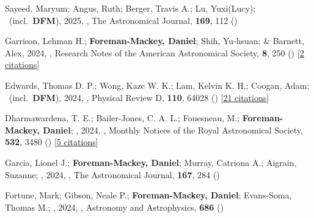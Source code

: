\item[{\color{numcolor}\scriptsize107}] Sayeed, Maryum; Angus, Ruth; Berger, Travis A.; Lu, Yuxi(Lucy); \etal\ (incl.\ \textbf{DFM}), 2025, , The Astronomical Journal, \textbf{169}, 112 ()

\item[{\color{numcolor}\scriptsize106}] Garrison, Lehman H.; \textbf{Foreman-Mackey, Daniel}; Shih, Yu-hsuan; \& Barnett, Alex, 2024, , Research Notes of the American Astronomical Society, \textbf{8}, 250 () [\href{https://ui.adsabs.harvard.edu/abs/2024RNAAS...8..250G}{2 citations}]

\item[{\color{numcolor}\scriptsize105}] Edwards, Thomas D. P.; Wong, Kaze W. K.; Lam, Kelvin K. H.; Coogan, Adam; \etal\ (incl.\ \textbf{DFM}), 2024, , Physical Review D, \textbf{110}, 64028 () [\href{https://ui.adsabs.harvard.edu/abs/2024PhRvD.110f4028E}{21 citations}]

\item[{\color{numcolor}\scriptsize104}] Dharmawardena, T. E.; Bailer-Jones, C. A. L.; Fouesneau, M.; \textbf{Foreman-Mackey, Daniel}; \etal, 2024, , Monthly Notices of the Royal Astronomical Society, \textbf{532}, 3480 () [\href{https://ui.adsabs.harvard.edu/abs/2024MNRAS.532.3480D}{5 citations}]

\item[{\color{numcolor}\scriptsize103}] Garcia, Lionel J.; \textbf{Foreman-Mackey, Daniel}; Murray, Catriona A.; Aigrain, Suzanne; \etal, 2024, , The Astronomical Journal, \textbf{167}, 284 ()

\item[{\color{numcolor}\scriptsize102}] Fortune, Mark; Gibson, Neale P.; \textbf{Foreman-Mackey, Daniel}; Evans-Soma, Thomas M.; \etal, 2024, , Astronomy and Astrophysics, \textbf{686} ()

